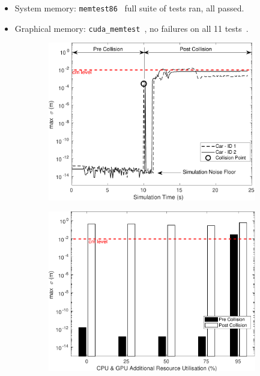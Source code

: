 \begin{itemize}[leftmargin=*]
    \item System memory: \texttt{memtest86}~\cite{MemTest86} full suite of tests ran, all passed.
    \item Graphical memory: \texttt{cuda\_memtest}~\cite{cuda_memtest}, no failures on all 11 tests~\cite{shi2009testing}.
\end{itemize}

\DIFdelbegin %

\DIFdelend \begin{figure}[t]
    \centering
    \begin{subfigure}{.49\textwidth}
        \includegraphics[width=1\textwidth]{../other/figures/CarsCollisionCG25_V4.pdf}
        \caption{}
        \label{CarsCollisionCG25}
    \end{subfigure}
    \begin{subfigure}{.49\textwidth}
        \includegraphics[width=1\textwidth]{../other/figures/CarsCollisionPrePostV5.pdf}

\end{subfigure}
\end{figure}

